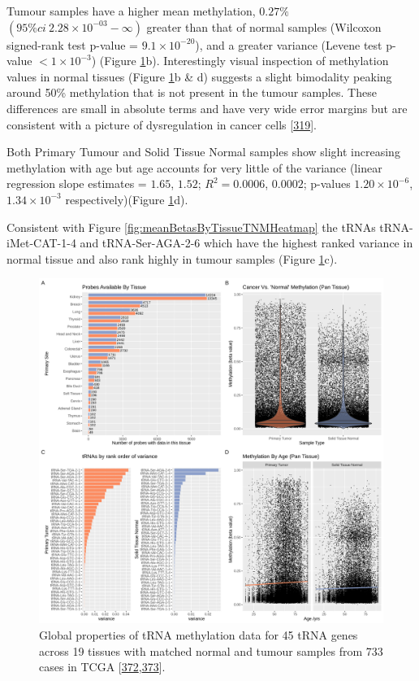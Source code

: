 \documentclass[
]{book}
\begin{document}
Tumour samples have a higher mean methylation, \(0.27\%\) \((95\% ci~ 2.28\times10^{-03}-\infty)\) greater than that of normal samples (Wilcoxon signed-rank test p-value = \(9.1\times10^{-20}\)), and a greater variance (Levene test p-value \(< 1\times10^{-3}\)) (Figure \ref{fig:cancerVsNormalCombinedPlots}b).
Interestingly visual inspection of methylation values in normal tissues (Figure \ref{fig:cancerVsNormalCombinedPlots}b \& d) suggests a slight bimodality peaking around 50\% methylation that is not present in the tumour samples.
These differences are small in absolute terms and have very wide error margins but are consistent with a picture of dysregulation in cancer cells {[}\protect\hyperlink{ref-Huang2018}{319}{]}.

Both Primary Tumour and Solid Tissue Normal samples show slight increasing methylation with age but age accounts for very little of the variance (linear regression slope estimates = \(1.65\), \(1.52\); \(R^2= 0.0006\), \(0.0002\); p-values \(1.20\times10^{-6}\), \(1.34\times10^{-3}\) respectively)(Figure \ref{fig:cancerVsNormalCombinedPlots}d).

Consistent with Figure \ref{fig:meanBetasByTissueTNMHeatmap} the tRNAs tRNA-iMet-CAT-1-4 and tRNA-Ser-AGA-2-6 which have the highest ranked variance in normal tissue and also rank highly in tumour samples (Figure \ref{fig:cancerVsNormalCombinedPlots}c).

\begin{figure}

{\centering \includegraphics[width=1\linewidth]{./figs/cancerVsNormalCombinedPlots} 

}

\caption{Global properties of tRNA methylation data for 45 tRNA genes across 19 tissues with matched normal and tumour samples from 733 cases in TCGA {[}\protect\hyperlink{ref-Yang2016}{372},\protect\hyperlink{ref-Nazor2012}{373}{]}.}\label{fig:cancerVsNormalCombinedPlots}
\end{figure}
\end{document}
